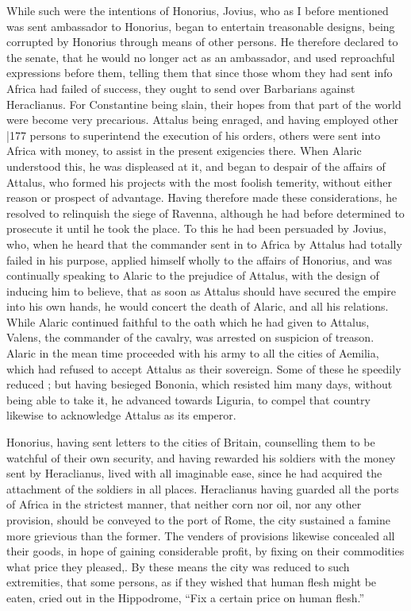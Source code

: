 While such were the intentions of Honorius, Jovius, who as I before mentioned was sent ambassador to Honorius, began to entertain treasonable designs, being corrupted by Honorius through means of other persons. He therefore declared to the senate, that he would no longer act as an ambassador, and used reproachful expressions before them, telling them that since those whom they had sent info Africa had failed of success, they ought to send over Barbarians against Heraclianus. For Constantine being slain, their hopes from that part of the world were become very precarious. Attalus being enraged, and having employed other
|177 persons to superintend the execution of his orders, others were sent into Africa with money, to assist in the present exigencies there. When Alaric understood this, he was displeased at it, and began to despair of the affairs of Attalus, who formed his projects with the most foolish temerity, without either reason or prospect of advantage. Having therefore made these considerations, he resolved to relinquish the siege of Ravenna, although he had before determined to prosecute it until he took the place. To this he had been persuaded by Jovius, who, when he heard that the commander sent in to Africa by Attalus had totally failed in his purpose, applied himself wholly to the affairs of Honorius, and was continually speaking to Alaric to the prejudice of Attalus, with the design of inducing him to believe, that as soon as Attalus should have secured the empire into his own hands, he would concert the death of Alaric, and all his relations. While Alaric continued faithful to the oath which he had given to Attalus, Valens, the commander of the cavalry, was arrested on suspicion of treason. Alaric in the mean time proceeded with his army to all the cities of Aemilia, which had refused to accept Attalus as their sovereign. Some of these he speedily reduced ; but having besieged Bononia, which resisted him many days, without being able to take it, he advanced towards Liguria, to compel that country likewise to acknowledge Attalus as its emperor.

Honorius, having sent letters to the cities of Britain, counselling them to be watchful of their own security, and having rewarded his soldiers with the money sent by Heraclianus, lived with all imaginable ease, since he had acquired the attachment of the soldiers in all places. Heraclianus having guarded all the ports of Africa in the strictest manner, that neither corn nor oil, nor any other provision, should be conveyed to the port of Rome, the city sustained a famine more grievious than the former. The venders of provisions likewise concealed all their goods, in hope of gaining considerable profit, by fixing on their commodities
what price they pleased,. By these means the city was reduced to such extremities, that some persons, as if they wished that human flesh might be eaten, cried out in the Hippodrome, ``Fix a certain price on human flesh.''

